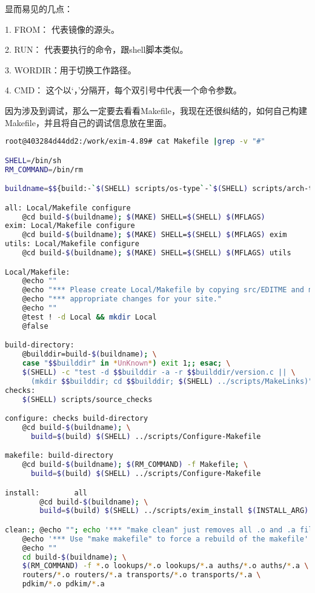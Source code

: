 \documentclass[12pt]{article}  %
\begin{document}
显而易见的几点：\par
1. FROM： 代表镜像的源头。\par
2. RUN：  代表要执行的命令，跟shell脚本类似。\par
3. WORDIR：用于切换工作路径。\par
4. CMD：   这个以‘，’分隔开，每个双引号中代表一个命令参数。\par
因为涉及到调试，那么一定要去看看Makefile，我现在还很纠结的，如何自己构建Makefile，并且将自己的调试信息放在里面。
\begin{lstlisting}[language=sh]
root@403284d44dd2:/work/exim-4.89# cat Makefile |grep -v "#"

SHELL=/bin/sh
RM_COMMAND=/bin/rm

buildname=$${build:-`$(SHELL) scripts/os-type`-`$(SHELL) scripts/arch-type`}$${EXIM_BUILD_SUFFIX:+.$$EXIM_BUILD_SUFFIX}

all: Local/Makefile configure
	@cd build-$(buildname); $(MAKE) SHELL=$(SHELL) $(MFLAGS)
exim: Local/Makefile configure
	@cd build-$(buildname); $(MAKE) SHELL=$(SHELL) $(MFLAGS) exim
utils: Local/Makefile configure
	@cd build-$(buildname); $(MAKE) SHELL=$(SHELL) $(MFLAGS) utils

Local/Makefile:
	@echo ""
	@echo "*** Please create Local/Makefile by copying src/EDITME and making"
	@echo "*** appropriate changes for your site."
	@echo ""
	@test ! -d Local && mkdir Local
	@false

build-directory:
	@builddir=build-$(buildname); \
	case "$$builddir" in *UnKnown*) exit 1;; esac; \
	$(SHELL) -c "test -d $$builddir -a -r $$builddir/version.c || \
	  (mkdir $$builddir; cd $$builddir; $(SHELL) ../scripts/MakeLinks)";
checks:
	$(SHELL) scripts/source_checks

configure: checks build-directory
	@cd build-$(buildname); \
	  build=$(build) $(SHELL) ../scripts/Configure-Makefile

makefile: build-directory
	@cd build-$(buildname); $(RM_COMMAND) -f Makefile; \
	  build=$(build) $(SHELL) ../scripts/Configure-Makefile

install:        all
		@cd build-$(buildname); \
		build=$(build) $(SHELL) ../scripts/exim_install $(INSTALL_ARG)

clean:; @echo ""; echo '*** "make clean" just removes all .o and .a files'
	@echo '*** Use "make makefile" to force a rebuild of the makefile'
	@echo ""
	cd build-$(buildname); \
	$(RM_COMMAND) -f *.o lookups/*.o lookups/*.a auths/*.o auths/*.a \
	routers/*.o routers/*.a transports/*.o transports/*.a \
	pdkim/*.o pdkim/*.a


\end{lstlisting}
\end{document}

